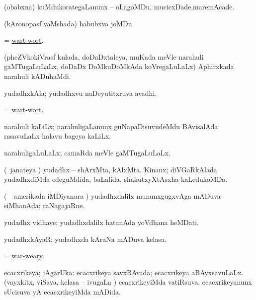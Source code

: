 \noindent 
\gl{\pagu}
\expl{}
\bmng
{} (obabxna) kuMdukorategaLanunx -- oLagoMDu, mucicxDade,maremAcade. 
\emng
\eentry

\bentry
{} 
\gl{\nA}
\expl{}
\bmng
(kAronopasf vaMshada) habubxva joMDu. 
\emng
\eentry

\bentry
{} 
\gl{\nA}
\expl{}
\bmng
= \hyperlink{wart-wort}{wart-wort}. 
\emng
\eentry

\bentry
{} 
\gl{\nA}
\expl{}
\bmng
(pheZVkokiVrasf kulada, doDaDxtaleya, muKada meVle narahuli gaMTugaLuLaLx, doDaDx DoMkuDoMkAda koVregaLuLaLx) Aphirxkada narahuli kADuhaMdi.  
\emng
\eentry

\bentry
{} 
\gl{\nA}
\expl{}
\bmng
yudadhxkAla; yudadhxvu naDeyutitxruva avadhi. 
\emng
\eentry

\bentry
{} 
\gl{\nA}
\expl{}
\bmng
= \hyperlink{wart-wort}{wart-wort}. 
\emng
\eentry

\bentry
{} 
\gl{\nA}
\expl{}
\bmng
narahuli kaLiLx; narahuligaLanunx guNapaDisuvudeMdu BAvisalAda rasavuLaLx halavu bageya kaLiLx. 
\emng
\eentry

\bentry
{} 
\gl{\gu}
\expl{}
\bmng
narahuligaLuLaLx; camaRda meVle gaMTugaLuLaLx. 
\emng
\eentry

\bentry
{} 
\gl{\gu}
\expl{}
\bmng
(\kanmu\ janateya \vi) yudadhx -- shArxMta, kAlxMta, Kinanx; diVGaRkAlada yudadhxdiMda edeguMdida, baLalida, shakutxyXtAsxha kaLedukoMDa. 
\emng
\eentry

\bentry
{} 
\gl{\nA}
\expl{}
\bmng
(\kanmu\ \kanu\ amerikada iMDiyanara \vi) yudadhxdalilx mununxgugxvAga mADuva siMhanAda; raNagajaRne. 
\emng
\eentry

\bentry
{} 
\gl{\nA}
\expl{}
\bmng
yudadhx vidhave; yudadhxdalilx hatanAda yoVdhana heMDati. 
\emng
\eentry

\bentry
{} 
\gl{\nA}
\expl{}
\bmng
yudadhxkAyaR; yudadhxda kAraNa mADuva kelasa. 
\emng
\eentry

\bentry
{} 
\gl{\gu}
\expl{}
\bmng
= \hyperlink{war-weary}{war-weary}. 
\emng
\eentry

\bentry
{} 
\gl{\gu}
\bmng
ecacxrikeya; jAgarUka: 
\banum
{} ecacxrikeya savxBAvada; ecacxrikeya aBAyxsavuLaLx. 
 (vayxkitx, viSaya, kelasa -- ivugaLa \vi) ecacxrikeyiMda vatiRsuva. 
 ecacxrikeyanunx sUcisuva yA ecacxrikeyiMda mADida. 
\eanum
\emng
\eentry

